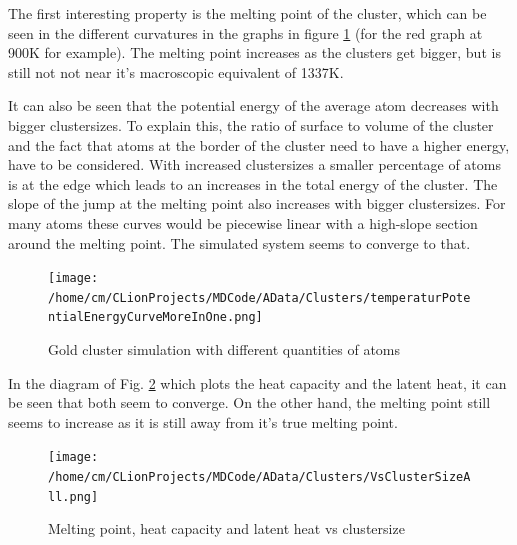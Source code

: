 \par 
The first interesting property is the melting point of the cluster, which can be seen in the different curvatures in the graphs in figure \ref{GoldClusterSimulationTemperaturEnergy4In1} (for the red graph at 900K for example). The melting point increases as the clusters get bigger, but is still not not near it's macroscopic equivalent of 1337K. 
\par
It can also be seen that the potential energy of the average atom decreases with bigger clustersizes. To explain this, the ratio of surface to volume of the cluster and the fact that atoms at the border of the cluster need to have a higher energy, have to be considered. With increased clustersizes a smaller percentage of atoms is at the edge which leads to an increases in the total energy of the cluster. 
The slope of the jump at the melting point also increases with bigger clustersizes. For many atoms these curves would be piecewise linear with a high-slope section around the melting point. The simulated system seems to converge to that. 

\begin{figure}
	\begin{center} 
		\texttt{[image: /home/cm/CLionProjects/MDCode/AData/Clusters/temperaturPotentialEnergyCurveMoreInOne.png]} 
	\end{center} 
	\caption[Gold cluster simulation]{Gold cluster simulation with different quantities of atoms} 
	\label{GoldClusterSimulationTemperaturEnergy4In1} 
\end{figure} 

In the diagram of Fig. \ref{GoldClusterSimulationVsClustersize} which plots the heat capacity and the latent heat, it can be seen that both seem to converge. On the other hand, the melting point still seems to increase as it is still away from it's true melting point.

\begin{figure}
	\begin{center} 
		\texttt{[image: /home/cm/CLionProjects/MDCode/AData/Clusters/VsClusterSizeAll.png]} 
	\end{center} 
	\caption[Melting point, heat capacity and latent heat vs clustersize]{Melting point, heat capacity and latent heat vs clustersize} 
	\label{GoldClusterSimulationVsClustersize} 
\end{figure} 
